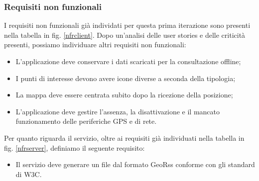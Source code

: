 \subsubsection{Requisiti non funzionali}
I requisiti non funzionali già individati per questa prima iterazione sono presenti nella tabella in fig. \ref{nfrclient}.
Dopo un'analisi delle user stories e delle criticità presenti, possiamo individuare altri requisiti non funzionali:
\begin{itemize}
\item L'applicazione deve conservare i dati scaricati per la consultazione offline;
\item I punti di interesse devono avere icone diverse a seconda della tipologia;
\item La mappa deve essere centrata subito dopo la ricezione della posizione;
\item L'applicazione deve gestire l'assenza, la disattivazione e il mancato funzionamento delle periferiche GPS e di rete.
\end{itemize}

Per quanto riguarda il servizio, oltre ai requisiti già individuati nella tabella in fig. \ref{nfrserver}, definiamo il seguente requisito:
\begin{itemize}
\item Il servizio deve generare un file dal formato GeoRss conforme con gli standard di W3C.
\end{itemize}



